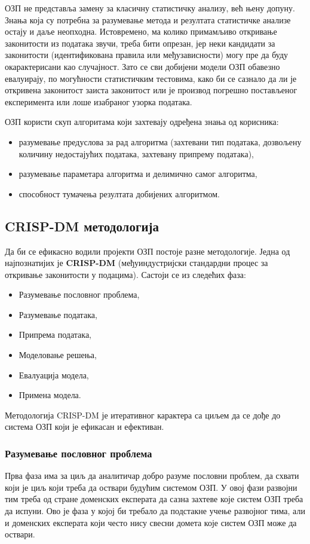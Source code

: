 ОЗП не представља замену за класичну статистичку анализу, већ њену допуну. Знања која су потребна за разумевање метода и резултата статистичке анализе остају и даље неопходна. Истовремено, ма колико примамљиво откривање законитости из података звучи, треба бити опрезан, јер неки кандидати за законитости (идентификована правила или међузависности) могу пре да буду окарактерисани као случајност. Зато се сви добијени модели ОЗП обавезно евалуирају, по могућности статистичким тестовима, како би се сазнало да ли је откривена законитост заиста законитост или је производ погрешно постављеног експеримента или лоше изабраног узорка података.

ОЗП користи скуп алгоритама који захтевају одређена знања од корисника:

\begin{itemize}
  \item разумевање предуслова за рад алгоритма (захтевани тип података, дозвољену количину недостајућих података, захтевану припрему података),
  \item разумевање параметара алгоритма и делимично самог алгоритма,
  \item способност тумачења резултата добијених алгоритмом.
\end{itemize}

\subsection{CRISP-DM методологија}
Да би се ефикасно водили пројекти ОЗП постоје разне методологије. Једна од најпознатијих је \textbf{CRISP-DM} (међуиндустријски стандардни процес за откривање законитости у подацима). Састоји се из следећих фаза:

\begin{itemize}
  \item Разумевање пословног проблема,
  \item Разумевање података,
  \item Припрема података,
  \item Моделовање решења,
  \item Евалуација модела,
  \item Примена модела.
\end{itemize}
Методологија CRISP-DM је итеративног карактера са циљем да се дође до система ОЗП који је ефикасан и ефективан.

\subsubsection{Разумевање пословног проблема}
Прва фаза има за циљ да аналитичар добро разуме пословни проблем, да схвати који је циљ који треба да оствари будућим системом ОЗП. У овој фази развојни тим треба од стране доменских експерата да сазна захтеве које систем ОЗП треба да испуни. Ово је фаза у којој би требало да подстакне учење развојног тима, али и доменских експерата који често нису свесни домета које систем ОЗП може да оствари.

